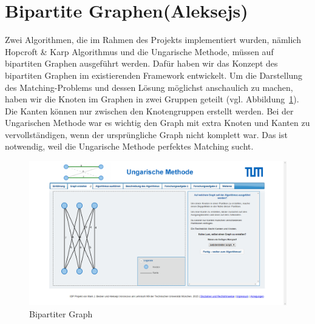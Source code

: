 \section{Bipartite Graphen(Aleksejs)}
Zwei Algorithmen, die im Rahmen des Projekts implementiert wurden, nämlich Hopcroft \& Karp Algorithmus und die Ungarische Methode, müssen auf bipartiten Graphen ausgeführt werden. Dafür haben wir das Konzept des bipartiten Graphen im existierenden Framework entwickelt. Um die Darstellung des Matching-Problems und dessen Lösung möglichst anschaulich zu machen, haben wir die Knoten im Graphen in zwei Gruppen geteilt (vgl. Abbildung~\ref{fig:hungarian-bipartite}). Die Kanten können nur zwischen den Knotengruppen erstellt werden. Bei der Ungarischen Methode war es wichtig den Graph mit extra Knoten und Kanten zu vervollständigen, wenn der ursprüngliche Graph nicht komplett war. Das ist notwendig, weil die Ungarische Methode perfektes Matching sucht.
\begin{figure}[h!]
	\centering
	\includegraphics[width=\textwidth]{figures/hungarian-bipartite}
	\caption[Ungarische Methode]{Bipartiter Graph}\label{fig:hungarian-bipartite}
\end{figure}

